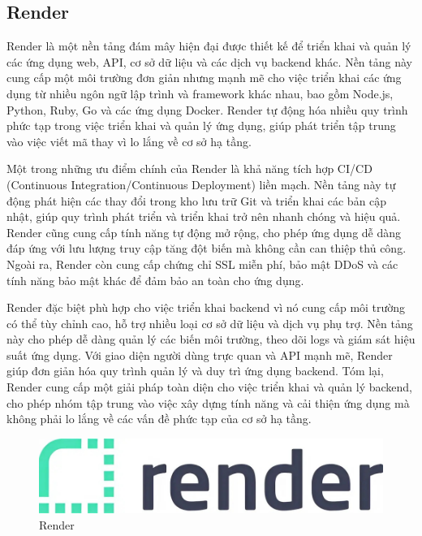 \subsection{Render}
Render \cite{render} là một nền tảng đám mây hiện đại được thiết kế để triển khai và quản lý các ứng dụng web, API, cơ sở dữ liệu và các dịch vụ backend khác. Nền tảng này cung cấp một môi trường đơn giản nhưng mạnh mẽ cho việc triển khai các ứng dụng từ nhiều ngôn ngữ lập trình và framework khác nhau, bao gồm Node.js, Python, Ruby, Go và các ứng dụng Docker. Render tự động hóa nhiều quy trình phức tạp trong việc triển khai và quản lý ứng dụng, giúp phát triển tập trung vào việc viết mã thay vì lo lắng về cơ sở hạ tầng.

Một trong những ưu điểm chính của Render là khả năng tích hợp CI/CD (Continuous Integration/Continuous Deployment) liền mạch. Nền tảng này tự động phát hiện các thay đổi trong kho lưu trữ Git và triển khai các bản cập nhật, giúp quy trình phát triển và triển khai trở nên nhanh chóng và hiệu quả. Render cũng cung cấp tính năng tự động mở rộng, cho phép ứng dụng dễ dàng đáp ứng với lưu lượng truy cập tăng đột biến mà không cần can thiệp thủ công. Ngoài ra, Render còn cung cấp chứng chỉ SSL miễn phí, bảo mật DDoS và các tính năng bảo mật khác để đảm bảo an toàn cho ứng dụng.

Render đặc biệt phù hợp cho việc triển khai backend vì nó cung cấp môi trường có thể tùy chỉnh cao, hỗ trợ nhiều loại cơ sở dữ liệu và dịch vụ phụ trợ. Nền tảng này cho phép dễ dàng quản lý các biến môi trường, theo dõi logs và giám sát hiệu suất ứng dụng. Với giao diện người dùng trực quan và API mạnh mẽ, Render giúp đơn giản hóa quy trình quản lý và duy trì ứng dụng backend. Tóm lại, Render cung cấp một giải pháp toàn diện cho việc triển khai và quản lý backend, cho phép nhóm tập trung vào việc xây dựng tính năng và cải thiện ứng dụng mà không phải lo lắng về các vấn đề phức tạp của cơ sở hạ tầng.

\begin{figure}[h]
    \centering
    \includegraphics[width=0.5\linewidth]{Images/render.jpeg}
    \vspace{1em}
    \caption{Render}
\end{figure}
